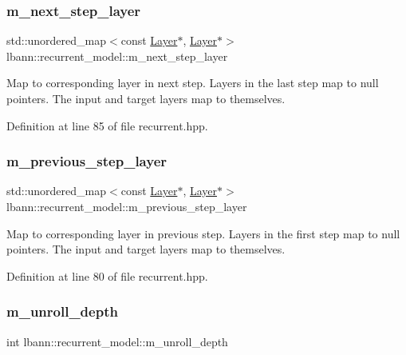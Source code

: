 \subsubsection{\texorpdfstring{m\+\_\+next\+\_\+step\+\_\+layer}{m\_next\_step\_layer}}
{\footnotesize\ttfamily std\+::unordered\+\_\+map$<$const \hyperlink{classlbann_1_1Layer}{Layer}$\ast$, \hyperlink{classlbann_1_1Layer}{Layer}$\ast$$>$ lbann\+::recurrent\+\_\+model\+::m\+\_\+next\+\_\+step\+\_\+layer\hspace{0.3cm}{\ttfamily [private]}}

Map to corresponding layer in next step. Layers in the last step map to null pointers. The input and target layers map to themselves. 

Definition at line 85 of file recurrent.\+hpp.

\mbox{\label{classlbann_1_1recurrent__model_ac728773d3de0cefb9390231dc176dca4}} 
\subsubsection{\texorpdfstring{m\+\_\+previous\+\_\+step\+\_\+layer}{m\_previous\_step\_layer}}
{\footnotesize\ttfamily std\+::unordered\+\_\+map$<$const \hyperlink{classlbann_1_1Layer}{Layer}$\ast$, \hyperlink{classlbann_1_1Layer}{Layer}$\ast$$>$ lbann\+::recurrent\+\_\+model\+::m\+\_\+previous\+\_\+step\+\_\+layer\hspace{0.3cm}{\ttfamily [private]}}

Map to corresponding layer in previous step. Layers in the first step map to null pointers. The input and target layers map to themselves. 

Definition at line 80 of file recurrent.\+hpp.

\mbox{\label{classlbann_1_1recurrent__model_a71eb93ebf3411a5c170f6570c93e3cca}} 
\subsubsection{\texorpdfstring{m\+\_\+unroll\+\_\+depth}{m\_unroll\_depth}}
{\footnotesize\ttfamily int lbann\+::recurrent\+\_\+model\+::m\+\_\+unroll\+\_\+depth\hspace{0.3cm}{\ttfamily [private]}}

